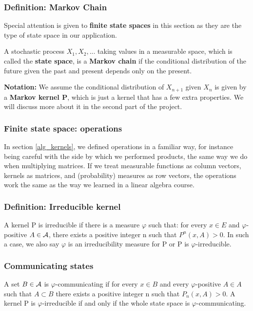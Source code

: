 \subsubsection{Definition: Markov Chain}

Special attention is given to \textbf{finite state spaces} in this section as they are the type of state space in our application.

A stochastic process $X_1, X_2, ...$ taking values in a measurable space, which is called the \textbf{state space}, is a \textbf{Markov chain} if the conditional distribution of the future given the past and present depends only on the present.

\textbf{Notation:} We assume the conditional distribution of $X_{n+1}$ given $X_n$ is given by a \textbf{Markov kernel P}, which is just a kernel that has a few extra properties. We will discuss more about it in the second part of the project.

\subsubsection{Finite state space: operations}
In section \ref{alg_kernels}, we defined operations in a familiar way, for instance being careful with the side by which we performed products, the same way we do when multiplying matrices. If we treat measurable functions as column vectors, kernels as matrices, and (probability) measures as row vectors, the operations work the same as the way we learned in a linear algebra course.

\subsubsection{Definition: Irreducible kernel}
A kernel P is irreducible if there is a measure $\varphi$ such that: for every $x \in E$ and $\varphi$-positive $A \in \mathcal{A}$, there exists a positive integer n such that $P^n(x,A) > 0$. In such a case, we also say $\varphi$ is an irreducibility measure for P or P is $\varphi$-irreducible.

\subsubsection{Communicating states}
A set $B \in \mathcal{A}$ is $\varphi$-communicating if for every $x \in B$ and every $\varphi$-positive $A \in A$ such that $A \subset B$ there exists a positive integer n such that $P_n(x,A) > 0$. A kernel P is $\varphi$-irreducible if and only if the whole state space is $\varphi$-communicating.

